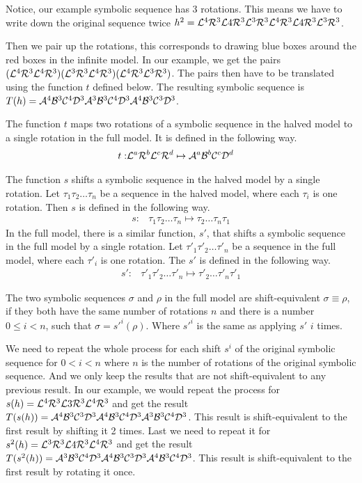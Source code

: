 Notice, our example symbolic sequence has 3 rotations.
This means we have to write down the original sequence twice $h^2 = \mathcal{L}^4\mathcal{R}^3\mathcal{L}4\mathcal{R}^3\mathcal{L}^3\mathcal{R}^3\mathcal{L}^4\mathcal{R}^3\mathcal{L}4\mathcal{R}^3\mathcal{L}^3\mathcal{R}^3$.

Then we pair up the rotations, this corresponds to drawing blue boxes around the red boxes in the infinite model.
In our example, we get the pairs $(\mathcal{L}^4\mathcal{R}^3\mathcal{L}^4\mathcal{R}^3)(\mathcal{L}^3\mathcal{R}^3\mathcal{L}^4\mathcal{R}^3)(\mathcal{L}^4\mathcal{R}^3\mathcal{L}^3\mathcal{R}^3)$.
The pairs then have to be translated using the function $t$ defined below.
The resulting symbolic sequence is $T(h) = \mathcal{A}^4\mathcal{B}^3\mathcal{C}^4\mathcal{D}^3\mathcal{A}^3\mathcal{B}^3\mathcal{C}^4\mathcal{D}^3\mathcal{A}^4\mathcal{B}^3\mathcal{C}^3\mathcal{D}^3$.

\begin{definition}
	The function $t$ maps two rotations of a symbolic sequence in the halved model to a single rotation in the full model.
	It is defined in the following way.
	\begin{align}
		t: & \mathcal{L}^a\mathcal{R}^b\mathcal{L}^c\mathcal{R}^d \mapsto \mathcal{A}^a\mathcal{B}^b\mathcal{C}^c\mathcal{D}^d
	\end{align}
\end{definition}

\begin{definition}
	The function $s$ shifts a symbolic sequence in the halved model by a single rotation.
	Let $\tau_1\tau_2 \dots \tau_n$ be a sequence in the halved model, where each $\tau_i$ is one rotation.
	Then $s$ is defined in the following way.
	\begin{align}
		s: & \tau_1\tau_2 \dots \tau_n \mapsto \tau_2 \dots \tau_n\tau_1
	\end{align}
	In the full model, there is a similar function, $s'$, that shifts a symbolic sequence in the full model by a single rotation.
	Let $\tau'_1\tau'_2 \dots \tau'_n$ be a sequence in the full model, where each $\tau'_i$ is one rotation.
	The $s'$ is defined in the following way.
	\begin{align}
		s': & \tau'_1\tau'_2 \dots \tau'_n \mapsto \tau'_2 \dots \tau'_n\tau'_1
	\end{align}
\end{definition}

\begin{definition}
	The two symbolic sequences $\sigma$ and $\rho$ in the full model are shift-equivalent $\sigma \equiv \rho$,
	if they both have the same number of rotations $n$
	and there is a number $0 \leq i < n$, such that $\sigma = s'^i(\rho)$.
	Where $s'^i$ is the same as applying $s'$ $i$ times.
\end{definition}

We need to repeat the whole process for each shift $s^i$ of the original symbolic sequence for $0 < i < n$ where $n$ is the number of rotations of the original symbolic sequence.
And we only keep the results that are not shift-equivalent to any previous result.
In our example, we would repeat the process for $s(h) = \mathcal{L}^4\mathcal{R}^3\mathcal{L}3\mathcal{R}^3\mathcal{L}^4\mathcal{R}^3$ and get the result $T(s(h)) = \mathcal{A}^4\mathcal{B}^3\mathcal{C}^3\mathcal{D}^3\mathcal{A}^4\mathcal{B}^3\mathcal{C}^4\mathcal{D}^3\mathcal{A}^3\mathcal{B}^3\mathcal{C}^4\mathcal{D}^3$.
This result is shift-equivalent to the first result by shifting it 2 times.
Last we need to repeat it for $s^2(h) = \mathcal{L}^3\mathcal{R}^3\mathcal{L}4\mathcal{R}^3\mathcal{L}^4\mathcal{R}^3$ and get the result $T(s^2(h)) = \mathcal{A}^3\mathcal{B}^3\mathcal{C}^4\mathcal{D}^3\mathcal{A}^4\mathcal{B}^3\mathcal{C}^3\mathcal{D}^3\mathcal{A}^4\mathcal{B}^3\mathcal{C}^4\mathcal{D}^3$.
This result is shift-equivalent to the first result by rotating it once.

